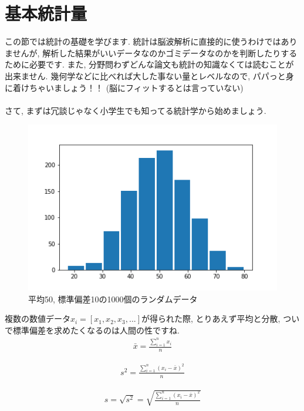 \documentclass[11pt,a4paper]{jreport}
\begin{document}
\section{基本統計量}
この節では統計の基礎を学びます. 統計は脳波解析に直接的に使うわけではありませんが, 解析した結果がいいデータなのかゴミデータなのかを判断したりするために必要です. また, 分野問わずどんな論文も統計の知識なくては読むことが出来ません. 幾何学などに比べれば大した事ない量とレベルなので, パパっと身に着けちゃいましょう！！ (脳にフィットするとは言っていない)\\
\\
さて, まずは冗談じゃなく小学生でも知ってる統計学から始めましょう.\\

\begin{figure}[H]
\label{im:histgram}
  \centering
  \includegraphics[width=120mm,bb=0 0 432 288]{figures/hist.png}
  \caption{平均50, 標準偏差10の1000個のランダムデータ}
\end{figure}

複数の数値データ$x_i = [x_1, x_2, x_3, ...]$が得られた際, とりあえず平均と分散, ついで標準偏差を求めたくなるのは人間の性ですね.\\
\begin{eqnarray}
\label{eq:ave}
\bar{x} = \frac{\sum_{i=1}^{n} x_i}{n}
\end{eqnarray}

\begin{eqnarray}
\label{eq:var}
s^2 = \frac{\sum_{i=1}^{n} (x_i - \bar{x})^2}{n}
\end{eqnarray}

\begin{eqnarray}
\label{eq:dev}
s = \sqrt{s^2} = \sqrt{\frac{\sum_{i=1}^{n} (x_i - \bar{x})^2}{n}}
\end{eqnarray}
\end{document}
